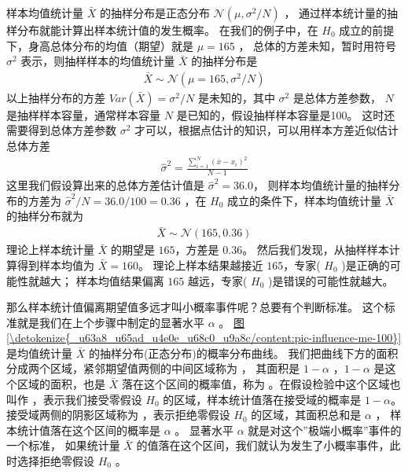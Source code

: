 \documentclass[letterpaper,10pt,english]{sphinxmanual}
\begin{document}
样本均值统计量 \(\bar{X}\) 的抽样分布是正态分布 \(\mathcal{N}(\mu,\sigma^2/N)\) ，
通过样本统计量的抽样分布就能计算出样本统计值的发生概率。
在我们的例子中，在 \(H_0\) 成立的前提下，身高总体分布的均值（期望）就是 \(\mu=165\) ，
总体的方差未知，暂时用符号 \(\sigma^2\) 表示，则抽样样本的均值统计量  \(\bar{X}\)
的抽样分布是
\begin{equation}\label{equation:推断与检验/content:推断与检验/content:85}
\begin{split}\bar{X} \sim \mathcal{N}(\mu=165,\sigma^2/N)\end{split}
\end{equation}
以上抽样分布的方差 \(Var(\bar{X} )=\sigma^2/N\) 是未知的，其中 \(\sigma^2\) 是总体方差参数，
\(N\) 是抽样样本容量，通常样本容量 \(N\) 是已知的，假设抽样样本容量是100。
这时还需要得到总体方差参数 \(\sigma^2\) 才可以，根据点估计的知识，可以用样本方差近似估计总体方差
\begin{equation}\label{equation:推断与检验/content:推断与检验/content:86}
\begin{split}\hat{\sigma}^2 = \frac{\sum_{i=1}^N (\bar{x}-x_i )^2 }{N-1}\end{split}
\end{equation}
这里我们假设算出来的总体方差估计值是 \(\hat{\sigma}^2=36.0\)，
则样本均值统计量的抽样分布的方差为 \(\hat{\sigma}^2/N=36.0/100=0.36\)
，在 \(H_0\) 成立的条件下，样本均值统计量 \(\bar{X}\) 的抽样分布就为
\begin{equation}\label{equation:推断与检验/content:推断与检验/content:87}
\begin{split}\bar{X} \sim \mathcal{N}(165,0.36)\end{split}
\end{equation}
理论上样本统计量 \(\bar{X}\) 的期望是 \(165\)，方差是 \(0.36\)。
然后我们发现，从抽样样本计算得到样本均值为 \(\bar{X}=160\)。
理论上样本结果越接近 \(165\)，专家( \(H_0\) )是正确的可能性就越大；
样本均值结果偏离 \(165\) 越远，专家( \(H_0\) )是错误的可能性就越大。

那么样本统计值偏离期望值多远才叫小概率事件呢？总要有个判断标准。
这个标准就是我们在上个步骤中制定的显著水平 \(\alpha\) 。
\hyperref[\detokenize{_u63a8_u65ad_u4e0e_u68c0_u9a8c/content:pic-influence-me-100}]{图 \ref{\detokenize{_u63a8_u65ad_u4e0e_u68c0_u9a8c/content:pic-influence-me-100}}} 是均值统计量 \(\bar{X}\) 的抽样分布(正态分布)的概率分布曲线。
我们把曲线下方的面积分成两个区域，紧邻期望值两侧的中间区域称为 ，
其面积是 \(1-\alpha\) ，\(1-\alpha\) 是这个区域的面积，也是 \(\bar{X}\)
落在这个区间的概率值，称为 。在假设检验中这个区域也叫作 ，表示我们接受零假设 \(H_0\)
的区域，样本统计值落在接受域的概率是 \(1-\alpha\)。
接受域两侧的阴影区域称为 ，表示拒绝零假设 \(H_0\) 的区域，其面积总和是 \(\alpha\) ，
样本统计值落在这个区间的概率是 \(\alpha\) 。
显著水平 \(\alpha\) 就是对这个”极端小概率”事件的一个标准，
如果统计量 \(\bar{X}\) 的值落在这个区间，我们就认为发生了小概率事件，此时选择拒绝零假设 \(H_0\)
。
\end{document}
